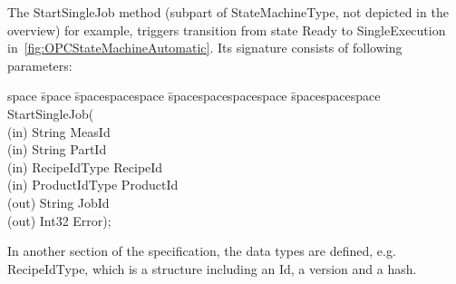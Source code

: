 The StartSingleJob method (subpart of StateMachineType, not depicted in the overview) for example, triggers transition from state Ready to SingleExecution in~\ref{fig:OPCStateMachineAutomatic}. Its signature consists of following parameters:

\begin{tabbing}
    space \= space \= spacespacespace \= spacespacespacespace \= spacespacespace \kill
    \>  StartSingleJob(\\
    \>  \>  (in)	 \> 	String          \> MeasId\\
    \>  \>  (in)	 \> 	String          \> PartId\\
    \>  \>  (in)	 \> 	RecipeIdType    \> RecipeId\\
    \>  \>  (in)	 \> 	ProductIdType   \> ProductId\\
    \>  \>  (out)	 \> 	String          \> JobId\\
    \>  \>  (out)	 \> 	Int32           \> Error); 
\end{tabbing}

In another section of the specification, the data types are defined, e.g. RecipeIdType, which is a structure including an Id, a version and a hash.



